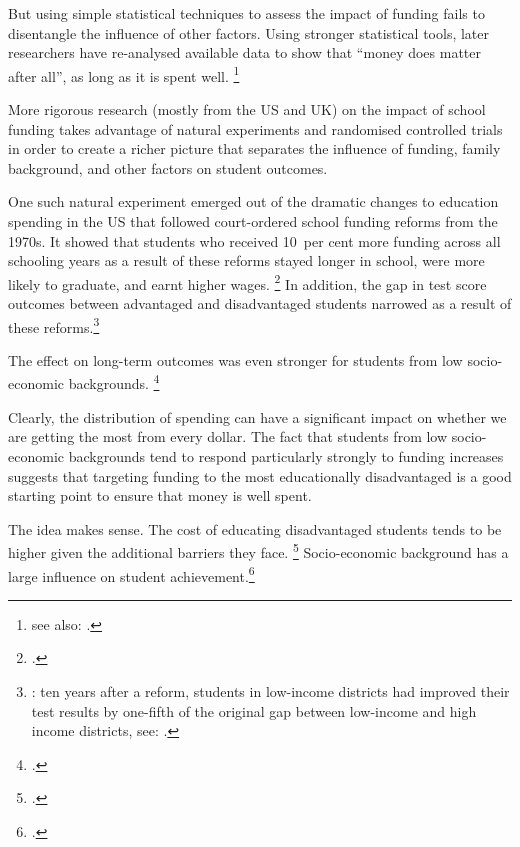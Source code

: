 \documentclass{grattan}
\begin{document}
But using simple statistical techniques to assess the impact of funding fails to disentangle the influence of other factors.
Using stronger statistical tools, later researchers have re-analysed available data to show that ``money does matter after all'', as long as it is spent well.%
\footnote{\textcite[][13]{Hedges1994ExchangePartI} see also: \textcites{Greenwald1996EffectSchoolResources}{Krueger2003EconomicConsiderationsClass}.}

More rigorous research (mostly from the US and UK) on the impact of school funding takes advantage of natural experiments and randomised controlled trials in order to create a richer picture that separates the influence of funding, family background, and other factors on student outcomes.

One such natural experiment emerged out of the dramatic changes to education spending in the US that followed court-ordered school funding reforms from the 1970s.
It showed that students who received 10~per cent more funding across all schooling years as a result of these reforms stayed longer in school, were more likely to graduate, and earnt higher wages.%
\footcite{Jackson2016EffectsSchoolSpending}
In addition, the gap in test score outcomes between advantaged and disadvantaged students narrowed as a result of these reforms.\footnote{\textcite[][80]{Card2002Schoolfinancereform}: ten years after a reform, students in low-income districts had improved their test results by one-fifth of the original gap between low-income and high income districts, see: \textcite{Lafortune2016SchoolFinanceReform}.}

The effect on long-term outcomes was even stronger for students from low socio-economic backgrounds. \footcites{Card2002Schoolfinancereform}{Jackson2016EffectsSchoolSpending}{Lafortune2016SchoolFinanceReform}

Clearly, the distribution of spending can have a significant impact on whether we are getting the most from every dollar.
The fact that students from low socio-economic backgrounds tend to respond particularly strongly to funding increases suggests that targeting funding to the most educationally disadvantaged is a good starting point to ensure that money is well spent.

The idea makes sense. The cost of educating disadvantaged students tends to be higher given the additional barriers they face.%
\footcite{OECD2012EquityQualityEducation}
Socio-economic background has a large influence on student achievement.\footnote{\textcite{Hattie2008visiblelearningsynthesis}.}
\end{document}
